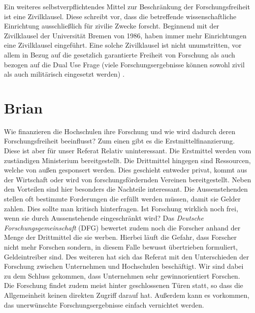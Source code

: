 \documentclass{pmwk}
\begin{document}
Ein weiteres selbstverpflichtendes Mittel zur Beschränkung der Forschungsfreiheit ist eine Zivilklausel. Diese schreibt vor, dass die betreffende wissenschaftliche Einrichtung ausschließlich für zivilie Zwecke forscht. Beginnend mit der Zivilklausel der Universität Bremen von 1986, haben immer mehr Einrichtungen eine Zivilklausel eingeführt. Eine solche Zivilklausel ist nicht unumstritten, vor allem in Bezug auf die gesetzlich garantierte Freiheit von Forschung als auch bezogen auf die Dual Use Frage (viele Forschungsergebnisse können sowohl zivil als auch militärisch eingesetzt werden) \cite{JKrause}. 

\section*{Brian}
Wie finanzieren die Hochschulen ihre Forschung und wie wird dadurch deren Forschungsfreiheit beeinflusst? Zum einen gibt es die Erstmittelfinanzierung. Diese ist aber für unser Referat Relativ uninteressant. Die Erstmittel werden vom zuständigen Ministerium bereitgestellt. Die Drittmittel hingegen sind Ressourcen, welche von außen gesponsert werden. Dies geschieht entweder privat, kommt aus der Wirtschaft oder wird von forschungsfördernden Vereinen bereitgestellt. Neben den Vorteilen sind hier besonders die Nachteile interessant. Die Aussenstehenden stellen oft bestimmte Forderungen die erfüllt werden müssen, damit sie Gelder zahlen. Dies sollte man kritisch hinterfragen. Ist Forschung wirklich noch frei, wenn sie durch Aussenstehende eingeschränkt wird? Das \textit{Deutsche Forschungsgemeinschaft} (DFG) bewertet zudem noch die Forscher anhand der Menge der Drittmittel die sie werben. Hierbei läuft die Gefahr, dass Forscher nicht mehr Forschen sondern, in diesem Falle bewusst übertrieben formuliert, Geldeintreiber sind. Des weiteren hat sich das Referat mit den Unterschieden der Forschung zwischen Unternehmen und Hochschulen beschäftigt. Wir sind dabei zu dem Schluss gekommen, dass Unternehmen sehr gewinnorientiert Forschen. Die Forschung findet zudem meist hinter geschlossenen Türen statt, so dass die Allgemeinheit keinen direkten Zugriff darauf hat. Außerdem kann es vorkommen, das unerwünschte Forschungsergebnisse einfach vernichtet werden.
\end{document}
